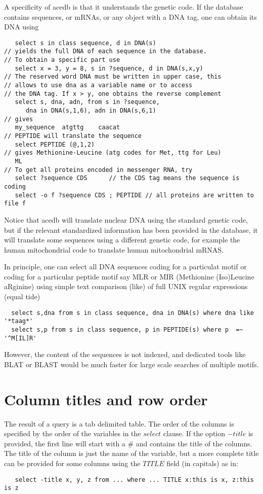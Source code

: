 \documentclass[11pt]{article}
\newcommand{\BL}{\begin{lstlisting}}
\begin{document}
A specificity of acedb is that it understands the genetic code. If the database contains sequences, or mRNAs, 
or any object with a DNA tag, one can obtain its DNA using
\BL
   select s in class sequence, d in DNA(s)
// yields the full DNA of each sequence in the database. 
// To obtain a specific part use
   select x = 3, y = 8, s in ?sequence, d in DNA(s,x,y)   
// The reserved word DNA must be written in upper case, this
// allows to use dna as a variable name or to access 
// the DNA tag. If x > y, one obtains the reverse complement
   select s, dna, adn, from s in ?sequence, 
      dna in DNA(s,1,6), adn in DNA(s,6,1)
// gives
   my_sequence  atgttg    caacat
// PEPTIDE will translate the sequence 
   select PEPTIDE (@,1,2)
// gives Methionine-Leucine (atg codes for Met, ttg for Leu)
   ML
// To get all proteins encoded in messenger RNA, try
   select ?sequence CDS      // the CDS tag means the sequence is coding
   select -o f ?sequence CDS ; PEPTIDE // all proteins are written to file f
\end{lstlisting}
Notice that acedb will translate nuclear DNA using the standard genetic code, 
but if the relevant standardized information has been provided in the database,
it will translate some sequences using a different genetic code,
for example the human mitochondrial code to translate human mitochondrial mRNAS.

In principle, one can select all DNA sequences coding for a particulat motif
or coding for a particular peptide motif
say MLR or MIR (Methionine (Iso)Leucine aRginine) using
simple text comparison (like) of full UNIX
regular expressions (equal tide)
\BL
  select s,dna from s in class sequence, dna in DNA(s) where dna like '*taag*'
  select s,p from s in class sequence, p in PEPTIDE(s) where p  =~ '^M[IL]R'
\end{lstlisting}
However, the content of the sequences is not indexed, and dedicated tools
like BLAT or BLAST would be much faster for large scale searches
of multiple motifs.

\section{Column titles and row order}

The result of a query is a tab delimited table. 
The order of the columns is specified by the order of the variables in the $select$ clause.
If the option $-$$title$ is provided, the first line will start with a \# and contains the title of the columns.
The title of the column is just the name of the variable, but a more 
complete title can be provided for some columns using the $TITLE$ field (in capitals)  as in:
\BL
   select -title x, y, z from ... where ... TITLE x:this is x, z:this is z
\end{lstlisting}
\end{document}

